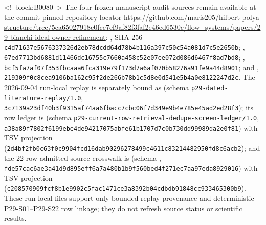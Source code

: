 \documentclass[11pt,a4paper]{article}
\begin{document}
<!--block:B0080-->
\begingroup\sloppy
The four frozen manuscript-audit sources remain available at the commit-pinned repository locator \url{https://github.com/maris205/hilbert-polya-structure/tree/5ca65027918c0fce7ef9af82f3faf2e46ed6530c/flow_systems/papers/29-bianchi-ideal-owner-refinement}: , SHA-256 \texttt{c4d71637\allowbreak{}e5676337\allowbreak{}326d2eb7\allowbreak{}8dcdd64d\allowbreak{}78b4b116\allowbreak{}a397c50c\allowbreak{}54a081d7\allowbreak{}c5e2650b}; , \texttt{67ed7713\allowbreak{}bd6881d1\allowbreak{}1466dc16\allowbreak{}755c7660\allowbreak{}a458c52e\allowbreak{}07ee072d\allowbreak{}086d6467\allowbreak{}f8ad7bd8}; , \texttt{bcf5fa7a\allowbreak{}f07f353f\allowbreak{}bcaaa6fc\allowbreak{}a319e79f\allowbreak{}173d7a6a\allowbreak{}f070b582\allowbreak{}76a91fe9\allowbreak{}a44d8901}; and , \texttt{219309f0\allowbreak{}c8cea910\allowbreak{}6ba162c9\allowbreak{}5f2de266\allowbreak{}b78b1c5d\allowbreak{}8e0d541e\allowbreak{}5b4a0e81\allowbreak{}22247d2c}. The 2026-09-04 run-local replay is separately bound as  (schema \texttt{p29-dated-literature-replay/1.0}, \texttt{3c7139a2\allowbreak{}3df40b3f\allowbreak{}9315af74\allowbreak{}aa6fbacc\allowbreak{}7cbc06f7\allowbreak{}d349e9b4\allowbreak{}e785e45a\allowbreak{}d2ed28f3}); its row ledger is  (schema \texttt{p29-current-row-retrieval-dedupe-screen-ledger/1.0}, \texttt{a38a89f7\allowbreak{}802f6199\allowbreak{}ebe4de94\allowbreak{}217075ab\allowbreak{}fe61b170\allowbreak{}7d7c0b73\allowbreak{}0dd99989\allowbreak{}da2e0f81}) with TSV projection  (\texttt{2d4bf2fb\allowbreak{}0c63f0c9\allowbreak{}904fcd16\allowbreak{}dab90296\allowbreak{}278499c4\allowbreak{}611c8321\allowbreak{}4482950f\allowbreak{}d8c6acb2}); and the 22-row admitted-source crosswalk is  (schema , \texttt{fde57cac\allowbreak{}6ae3a41d\allowbreak{}9d895eff\allowbreak{}6a7a480b\allowbreak{}1b9f560b\allowbreak{}ed4f271e\allowbreak{}c7aa97ed\allowbreak{}a8929016}) with TSV projection  (\texttt{c2085709\allowbreak{}09fcf8b1\allowbreak{}e9902c5f\allowbreak{}ac1471ce\allowbreak{}3a8392b0\allowbreak{}4cdbdb91\allowbreak{}848cc933\allowbreak{}465300b9}). These run-local files support only bounded replay provenance and deterministic P29-S01--P29-S22 row linkage; they do not refresh source status or scientific results.
\end{document}
